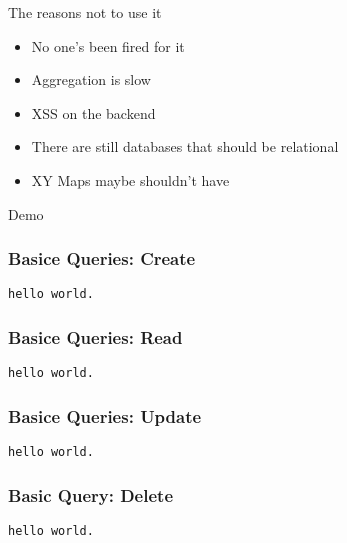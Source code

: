 \documentclass{beamer}
\begin{document}
\begin{frame}{The reasons not to use it}

\begin{itemize}
\item No one's been fired for it
\item Aggregation is slow
\item XSS on the backend
\item There are still databases that should be relational
\item XY Maps maybe shouldn't have
\end{itemize}

\end{frame}


\begin{frame}%

\begin{center}
   Demo
\end{center}

\end{frame}


\begin{frame}[fragile]

\frametitle{Basice Queries: Create}

\begin{lstlisting}
hello world.
\end{lstlisting}

\end{frame}


\begin{frame}[fragile]

\frametitle{Basice Queries: Read}

\begin{lstlisting}
hello world.
\end{lstlisting}

\end{frame}


\begin{frame}[fragile]

\frametitle{Basice Queries: Update}

\begin{lstlisting}
hello world.
\end{lstlisting}

\end{frame}


\begin{frame}[fragile]

\frametitle{Basic Query: Delete}

\begin{lstlisting}
hello world.
\end{lstlisting}

\end{frame}
\end{document}
